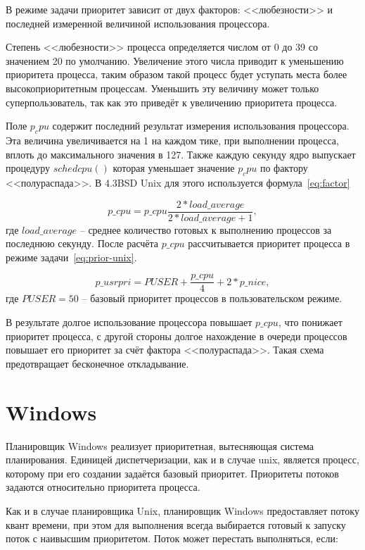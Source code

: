 В режиме задачи приоритет зависит от двух факторов: <<любезности>> и последней измеренной величиной использования процессора.

Степень <<любезности>> процесса определяется числом от 0 до 39 со значением 20 по умолчанию. Увеличение этого числа приводит к уменьшению приоритета процесса, таким образом такой процесс будет уступать места более высокоприоритетным процессам. Уменьшить эту величину может только суперпользователь, так как это приведёт к увеличению приоритета процесса.

Поле $p_cpu$ содержит последний результат измерения использования процессора. Эта величина увеличивается на 1 на каждом тике, при выполнении процесса, вплоть до максимального значения в 127. Также каждую секунду ядро выпускает процедуру $schedcpu()$ которая уменьшает значение $p_cpu$ по фактору <<полураспада>>. В 4.3BSD Unix для этого используется формула~\ref{eq:factor}

\begin{equation}
	\label{eq:factor}
	p\_cpu = p\_cpu\frac{2*load\_average}{2*load\_average+1},
\end{equation}
где $load\_average$ -- среднее количество готовых к выполнению процессов за последнюю секунду. После расчёта $p\_cpu$ рассчитывается приоритет процесса в режиме задачи~\ref{eq:prior-unix}.

\begin{equation}
	\label{eq:prior-unix}
	p\_usrpri = PUSER + \frac{p\_cpu}{4} + 2*p\_nice,
\end{equation}
где $PUSER = 50$ -- базовый приоритет процессов в пользовательском режиме.

В результате долгое использование процессора повышает $p\_cpu$, что понижает приоритет процесса, с другой стороны долгое нахождение в очереди процессов повышает его приоритет за счёт фактора <<полураспада>>. Такая схема предотвращает бесконечное откладывание.

\section{Windows}

Планировщик Windows реализует приоритетная, вытесняющая система планирования. Единицей диспетчеризации, как и в случае unix, является процесс, которому при его создании задаётся базовый приоритет. Приоритеты потоков задаются относительно приоритета процесса. 

Как и в случае планировщика Unix, планировщик Windows предоставляет потоку квант времени, при этом для выполнения всегда выбирается готовый к запуску поток с наивысшим приоритетом.
Поток может перестать выполняться, если:

